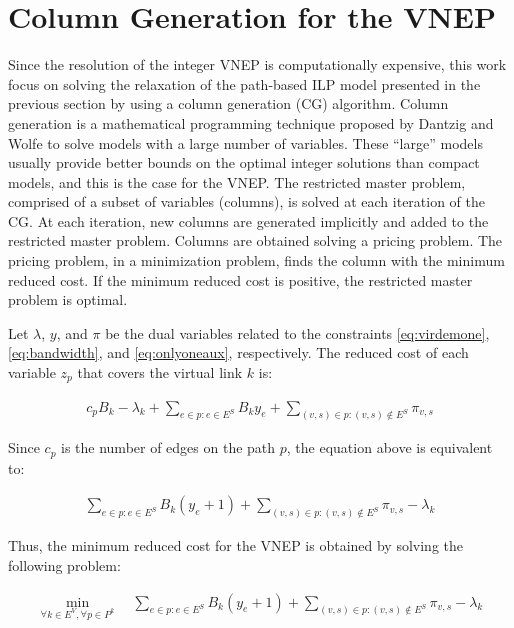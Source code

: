 \documentclass[article]{llncs}
\begin{document}
\section{Column Generation for the VNEP}
\label{sec:CG}

Since the resolution of the integer VNEP is computationally expensive, 
this work focus on solving the relaxation of the path-based ILP model presented in the previous section by using a column generation (CG) algorithm.
Column generation is a mathematical programming technique proposed by Dantzig and Wolfe \cite{Dantzig:1960} 
to solve models with a large number of variables.
These ``large'' models usually provide better bounds on the optimal integer solutions than compact models, and this is the case for the VNEP.
The restricted master problem, comprised of a subset of variables (columns), is solved at each iteration of the CG.
At each iteration, new columns are generated implicitly and added to the restricted master problem.
Columns are obtained solving a pricing problem.
The pricing problem, in a minimization problem, finds the column with the minimum reduced cost.
If the minimum reduced cost is positive, the restricted master problem is optimal.

Let $\lambda$, $y$, and  $\pi$ be the dual variables related to the constraints \eqref{eq:virdemone}, \eqref{eq:bandwidth}, and \eqref{eq:onlyoneaux}, respectively. The reduced cost of each variable $z_{p}$ that covers the virtual link $k$ is:

\begin{align}
  c_{p} B_{k} - \lambda_{k} + \sum\limits_{e \in p : e \in E^S} B_{k} y_{e}  + \sum\limits_{(v,s) \in p : (v,s) \notin E^S} \pi_{v,s}  \nonumber
\end{align}

Since $c_p$ is the number of edges on the path $p$, the equation above is equivalent to:

\begin{align}
  \sum\limits_{e \in p : e \in E^S} B_{k} (y_{e} + 1) + \sum\limits_{(v,s) \in p : (v,s) \notin E^S} \pi_{v,s} - \lambda_{k} \nonumber
\end{align}

Thus, the minimum reduced cost for the VNEP is obtained by solving the following problem:

\begin{align}
  \min_{ \forall k \in E^{V}, \forall p \in P^{k}}  \quad  \sum\limits_{e \in p : e \in E^S} B_{k} (y_{e} + 1) + \sum\limits_{(v,s) \in p : (v,s) \notin E^S} \pi_{v,s}-\lambda_{k} \nonumber
\end{align}
\end{document}

